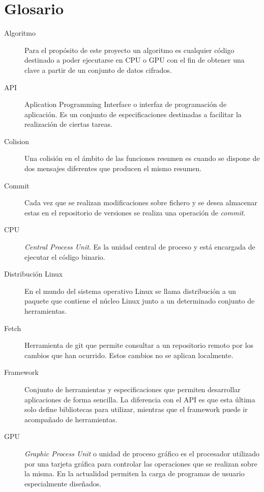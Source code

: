 \chapter{Glosario}

\begin{description}
	\item[Algoritmo] Para el propósito de este proyecto un algoritmo es cualquier código destinado a poder ejecutarse en CPU o GPU con el fin de obtener una clave a partir de un conjunto de datos cifrados.
	
	\item[API] Aplication Programming Interface o interfaz de programación de aplicación. Es un conjunto de especificaciones destinadas a facilitar la realización de ciertas tareas.
	
	\item[Colision] Una colisión en el ámbito de las funciones resumen es cuando se dispone de dos mensajes diferentes que producen el mismo resumen.
	
	\item[Commit] Cada vez que se realizan modificaciones sobre fichero y se desea almacenar estas en el repositorio de versiones se realiza una operación de \emph{commit}.

	\item[CPU] \emph{Central Process Unit}. Es la unidad central de proceso y está encargada de ejecutar el código binario.
	
	\item[Distribución Linux] En el mundo del sistema operativo Linux se llama distribución a un paquete que contiene el núcleo Linux junto a un determinado conjunto de herramientas.
	
	\item[Fetch] Herramienta de git que permite consultar a un repositorio remoto por los cambios que han ocurrido. Estos cambios no se aplican localmente.
	
	\item[Framework] Conjunto de herramientas y especificaciones que permiten desarrollar aplicaciones de forma sencilla. La diferencia con el API es que esta última solo define bibliotecas para utilizar, mientras que el framework puede ir acompañado de herramientas.
	
	\item[GPU] \emph{Graphic Process Unit} o unidad de proceso gráfico es el procesador utilizado por una tarjeta gráfica para controlar las operaciones que se realizan sobre la misma. En la actualidad permiten la carga de programas de usuario especialmente diseñados.
	

\end{description}
